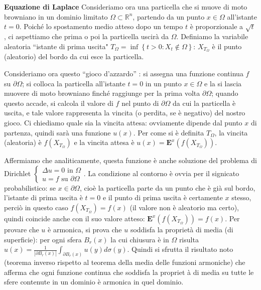 \documentclass{article}
\begin{document}
\textbf{Equazione di Laplace} Consideriamo ora una particella che si muove
di moto browniano in un dominio limitato $%
\Omega
\subset 
\mathbb{R}
^{n}$, partendo da un punto $x\in 
\Omega
$ all'istante $t=0$. Poich\'{e} lo spostamento medio atteso dopo un tempo $t$
\`{e} proporzionale a $\sqrt{t}$, ci aspettiamo che prima o poi la
particella uscir\`{a} da $%
\Omega
$. Definiamo la variabile aleatoria \textquotedblleft istante di prima
uscita" $T_{\Omega }=\inf \left\{ t>0:X_{t}\not\in \Omega \right\} $: $%
X_{T_{\Omega }}$ \`{e} il punto (aleatorio) del bordo da cui esce la
particella.

Consideriamo ora questo \textquotedblleft gioco d'azzardo\textquotedblright
: si assegna una funzione continua $f$ su $\partial 
\Omega
$; si colloca la particella all'istante $t=0$ in un punto $x\in 
\Omega
$ e la si lascia muovere di moto browniano finch\'{e} raggiunge per la prima
volta $\partial 
\Omega
$; quando questo accade, si calcola il valore di $f$ nel punto di $\partial 
\Omega
$ da cui la particella \`{e} uscita, e tale valore rappresenta la vincita (o
perdita, se \`{e} negativo) del nostro gioco. Ci chiediamo quale sia la
vincita attesa: ovviamente dipende dal punto $x$ di partenza, quindi sar\`{a}
una funzione $u(x)$. Per come si \`{e} definita $T_{\Omega }$, la vincita
(aleatoria) \`{e} $f\left( X_{T_{\Omega }}\right) $ e la vincita attesa \`{e}
$u\left( x\right) =\mathbf{E}^{x}\left( f\left( X_{T_{\Omega }}\right)
\right) $.

Affermiamo che analiticamente, questa funzione \`{e} anche soluzione del
problema di Dirichlet $\left\{ 
\begin{array}{c}
\Delta u=0\text{ in }\Omega \\ 
u=f\text{ su }\partial \Omega%
\end{array}%
\right. $. La condizione al contorno \`{e} ovvia per il signicato
probabilistico: se $x\in \partial \Omega $, cio\`{e} la particella parte da
un punto che \`{e} gi\`{a} sul bordo, l'istante di prima uscita \`{e} $t=0$
e il punto di prima uscita \`{e} certamente $x$ stesso, perci\`{o} in questo
caso $f(X_{T_{\Omega }})=f(x)$ (il valore non \`{e} aleatorio ma certo),
quindi coincide anche con il suo valore atteso: $\mathbf{E}^{x}\left(
f\left( X_{T_{\Omega }}\right) \right) =f(x)$. Per provare che $u$ \`{e}
armonica, si prova che $u$ soddisfa la propriet\`{a} di media (di
superficie): per ogni sfera $B_{r}\left( x\right) $ la cui chiusura \`{e} in 
$\Omega $ risulta $u\left( x\right) =\frac{1}{\left\vert \partial
B_{r}\left( x\right) \right\vert }\int_{\partial B_{r}\left( x\right)
}u\left( y\right) d\sigma \left( y\right) $. Quindi si sfrutta il risultato
noto (teorema inverso rispetto al teorema della media delle funzioni
armoniche) che afferma che ogni funzione continua che soddisfa la propriet%
\`{a} di media su tutte le sfere contenute in un dominio \`{e} armonica in
quel dominio.
\end{document}
